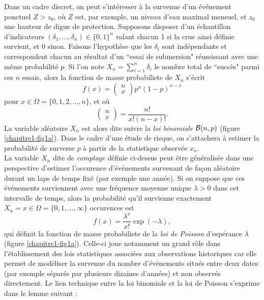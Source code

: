 Dans un cadre discret, on peut s'int\'eresser \`a la survenue d'un \'ev\'enement ponctuel $Z>z_0$, o\`u $Z$ est, par exemple, un niveau d'eau maximal mensuel, et $z_0$ une hauteur de digue de protection. Supposons disposer d'un \'echantillon d'indicateurs $(\delta_1,\ldots,\delta_n)\in\{0,1\}^n$ valant chacun 1 si la crue ainsi d\'efinie survient, et 0 sinon.  Faisons l'hypoth\`ese que les $\delta_i$ sont ind\'ependants et correspondent chacun au r\'esultat d'un ``essai de submersion" r\'eussissant avec une m\^eme probabilit\'e $p$. Si l'on note $X_n=\sum_{i=1}^n \delta_i$ le nombre total de ``succ\`es" parmi ces $n$ essais, alors la fonction de masse probabiliste de $X_n$ s'\'ecrit
$$
f(x) = \left(\begin{array}{l} n \\ x \end{array}\right) p^x (1-p)^{n-x}
$$
pour $x\in\Omega=\{0,1,2,\ldots,n\}$, et o\`u
$$
\left(\begin{array}{l} n \\ x \end{array}\right) = \frac{n!}{x!(n-x)!}.
$$
La variable al\'eatoire $X_n$ est alors dite suivre la {\it loi binomiale}  ${\cal{B}}(n,p)$ (figure \ref{chapitre1-fig1a}). Dans le cadre d'une \'etude de risque, on s'attachera \`a  estimer la probabilit\'e de surverse $p$ \`a partir de la statistique observ\'ee $x_n$. \\

La variable  $X_n$ dite de {\it comptage} d\'efinie ci-dessus peut \^etre g\'en\'eralis\'ee dans une perspective d'estimer l'occurence d'\'ev\'enements survenant de fa\c con al\'eatoire durant un laps de temps fix\'e (par exemple une ann\'ee). Si on suppose que ces \'ev\'enements surviennent avec une fr\'equence moyenne unique $\lambda>0$ dans cet intervalle de temps, alors la probabilit\'e qu'il survienne exactement $X_n=x\in\Omega=\{0,1,\ldots,\infty\}$ occurences est
$$
f(x) = \frac{\lambda^x}{x!} \exp(-\lambda),
$$  
qui d\'efinit la fonction de masse probabiliste de la {\it loi de Poisson}  d'esp\'erance $\lambda$ (figure \ref{chapitre1-fig1a}). Celle-ci joue notamment un grand r\^ole dans l'\'etablissement des lois  statistiques associ\'ees aux observations historiques car elle permet de mod\'eliser la survenue du nombre d'\'ev\'enements situ\'es entre deux dates (par exemple s\'epar\'es par plusieurs dizaines d'ann\'ees) et non observ\'es directement. Le lien technique entre la loi binomiale et la loi de Poisson s'exprime dans le lemme suivant : \\

